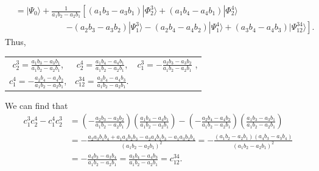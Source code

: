 \documentclass[a4paper]{book}
\newcounter{solution}[chapter]
\begin{document}
\begin{solution}
\begin{itemize}
\begin{align*}
		&= | \Psi_0 \rangle + \frac{1}{ a_1 b_2 - a_2 b_1 } \left[ ( a_1 b_3 - a_3 b_1 ) | \Phi^3_2 \rangle + ( a_1 b_4  - a_4 b_1 ) | \Phi^4_2 \rangle \right. \\
		&\hspace{6em} \left. - ( a_2 b_3 - a_3 b_2 ) | \Psi^3_1 \rangle - ( a_2 b_4 - a_4 b_2 ) | \Psi^4_1 \rangle + ( a_3 b_4  - a_4 b_3 ) | \Psi^{34}_{12} \rangle \right].
	\end{align*}
	Thus,	
	\begin{center}
	\renewcommand{\arraystretch}{2.5}
	\begin{tabular}{ccc}
		${\displaystyle c^3_2 = \frac{ a_1 b_3 - a_3 b_1 }{ a_1 b_2 - a_2 b_1 } }$, & ${\displaystyle c^4_2 = \frac{ a_1 b_4 - a_4 b_1 }{ a_1 b_2 - a_2 b_1 } }$, & ${\displaystyle c^3_1 = -\frac{ a_2 b_3 - a_3 b_2 }{ a_1 b_2 - a_2 b_1 } }$ , \\
		${\displaystyle c^4_1 = -\frac{ a_2 b_4 - a_4 b_2 }{ a_1 b_2 - a_2 b_1 } }$, & ${\displaystyle c^{34}_{12} = \frac{ a_3 b_4 - a_4 b_3 }{ a_1 b_2 - a_2 b_1 } }$.
	\end{tabular}
	\renewcommand{\arraystretch}{1.0}
	\end{center}		
	We can find that
	\begin{align*}
		c^3_1 c^4_2 - c^4_1 c^3_2 &= \left( -\frac{ a_2 b_3 - a_3 b_2 }{ a_1 b_2 - a_2 b_1 } \right) \left( \frac{ a_1 b_4 - a_4 b_1 }{ a_1 b_2 - a_2 b_1 } \right) - \left( -\frac{ a_2 b_4 - a_4 b_2 }{ a_1 b_2 - a_2 b_1 } \right) \left( \frac{ a_1 b_3 - a_3 b_1 }{ a_1 b_2 - a_2 b_1 } \right) \\
		&= - \frac{ a_2 a_3 b_1 b_4 + a_1 a_4 b_2 b_3 - a_2 a_4 b_1 b_3 - a_1 a_3 b_2 b_4 }{ ( a_1 b_2 - a_2 b_1 )^2 } = - \frac{ ( a_1 b_2 - a_2 b_1 )( a_4 b_3 - a_3 b_4 ) }{ ( a_1 b_2 - a_2 b_1 )^2 } \\
		&= - \frac{ a_4 b_3 - a_3 b_4 }{ a_1 b_2 - a_2 b_1  } = \frac{ a_3 b_4 - a_4 b_3 }{ a_1 b_2 - a_2 b_1 } = c^{34}_{12}.
	\end{align*}
	

\end{itemize}
\end{solution}
\end{document}

